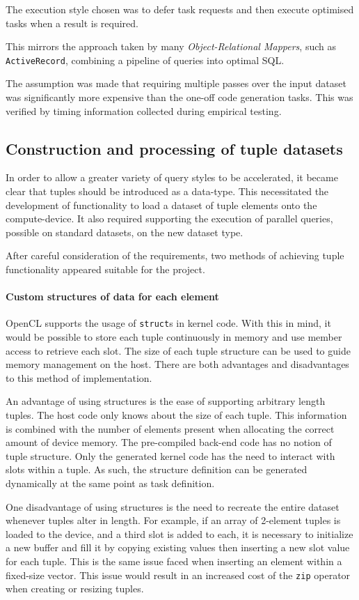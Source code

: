 The execution style chosen was to defer task requests and then execute optimised tasks when a result is required.

This mirrors the approach taken by many \emph{Object-Relational Mappers}, such as \verb|ActiveRecord|, combining a pipeline of queries into optimal SQL.

The assumption was made that requiring multiple passes over the input dataset was significantly more expensive than the one-off code generation tasks. This was verified by timing information collected during empirical testing.

\subsection{Construction and processing of tuple datasets}
In order to allow a greater variety of query styles to be accelerated, it became clear that tuples should be introduced as a data-type. This necessitated the development of functionality to load a dataset of tuple elements onto the compute-device. It also required supporting the execution of parallel queries, possible on standard datasets, on the new dataset type.

After careful consideration of the requirements, two methods of achieving tuple functionality appeared suitable for the project.

\paragraph*{Custom structures of data for each element} \ac{OpenCL} supports the usage of \verb|struct|s in kernel code. With this in mind, it would be possible to store each tuple continuously in memory and use member access to retrieve each slot. The size of each tuple structure can be used to guide memory management on the host. There are both advantages and disadvantages to this method of implementation. 

An advantage of using structures is the ease of supporting arbitrary length tuples. The host code only knows about the size of each tuple. This information is combined with the number of elements present when allocating the correct amount of device memory. The pre-compiled back-end code has no notion of tuple structure. Only the generated kernel code has the need to interact with slots within a tuple. As such, the structure definition can be generated dynamically at the same point as task definition. 

One disadvantage of using structures is the need to recreate the entire dataset whenever tuples alter in length. For example, if an array of 2-element tuples is loaded to the device, and a third slot is added to each, it is necessary to initialize a new buffer and fill it by copying existing values then inserting a new slot value for each tuple. This is the same issue faced when inserting an element within a fixed-size vector. This issue would result in an increased cost of the \verb|zip| operator when creating or resizing tuples.

